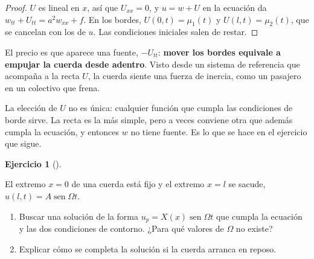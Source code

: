 \documentclass[
  spanish,
  a4paper,
]{scrbook}
\theoremstyle{definition}
\theoremstyle{plain}
\theoremstyle{definition}
\theoremstyle{plain}
\theoremstyle{definition}
\newtheorem{exercise}{Ejercicio}[chapter]
\theoremstyle{remark}
\begin{document}
\begin{proof}
\(U\) es lineal en \(x\), así que \(U_{xx} = 0\), y \(u = w+U\) en la
ecuación da \(w_{tt} + U_{tt} = a^2w_{xx} + f\). En los bordes,
\(U(0,t) = \mu_1(t)\) y \(U(l,t) = \mu_2(t)\), que se cancelan con los
de \(u\). Las condiciones iniciales salen de restar.
\end{proof}

El precio es que aparece una fuente, \(-U_{tt}\): \textbf{mover los
bordes equivale a empujar la cuerda desde adentro}. Visto desde un
sistema de referencia que acompaña a la recta \(U\), la cuerda siente
una fuerza de inercia, como un pasajero en un colectivo que frena.

La elección de \(U\) no es única: cualquier función que cumpla las
condiciones de borde sirve. La recta es la más simple, pero a veces
conviene otra que además cumpla la ecuación, y entonces \(w\) no tiene
fuente. Es lo que se hace en el ejercicio que sigue.

\begin{exercise}[]\protect\hypertarget{exr-hip-extremo-oscilante}{}\label{exr-hip-extremo-oscilante}

El extremo \(x=0\) de una cuerda está fijo y el extremo \(x=l\) se
sacude, \(u(l,t) = A\operatorname{sen}\Omega t\).

\begin{enumerate}
\def\labelenumi{\alph{enumi})}
\item
  Buscar una solución de la forma
  \(u_p = X(x)\operatorname{sen}\Omega t\) que cumpla la ecuación y las
  dos condiciones de contorno. ¿Para qué valores de \(\Omega\) no
  existe?
\item
  Explicar cómo se completa la solución si la cuerda arranca en reposo.
\end{enumerate}

\end{exercise}
\end{document}
